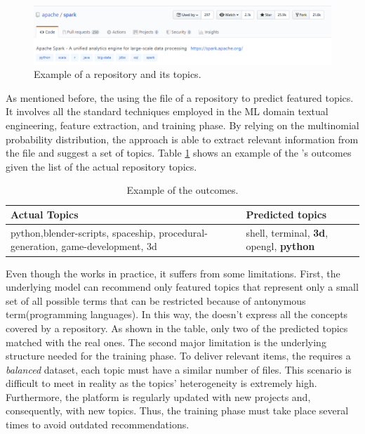 \begin{figure}[h!]
	\centering
	\includegraphics[width=0.8\linewidth]{figs/spark_topics.png}
	\caption{Example of a \GH repository and its topics.}
	\label{fig:spark}
\end{figure}

As mentioned before, the \MNB using the \RM file of a repository to predict featured topics. It involves all the standard techniques employed in the ML domain \ie textual engineering, feature extraction, and training phase. By relying on the multinomial probability distribution, the approach is able to extract relevant information from the \RM file and suggest a set of topics. Table \ref{tab:example} shows an example of the \MNB's outcomes given the list of the actual repository topics. 

\begin{table}[h]
\centering

\resizebox{8.5cm}{!} {

\begin{tabular}{| p{3.2cm} | p{3.2cm} | }
\hline
 \textbf{Actual Topics} &\textbf{ Predicted topics} \\ \hline
     python,blender-scripts, spaceship, procedural-generation, game-development, 3d        &  
  shell, terminal, \textbf{3d},	opengl,	\textbf{python}        \\ \hline

\end{tabular}
}
\caption{Example of the \MNB outcomes.}
\label{tab:example}
\end{table} 


Even though the \MNB works in practice, it suffers from some limitations. First, the underlying model can recommend only featured topics that represent only a small set of all possible terms that can be restricted because of antonymous term(\eg programming languages).
In this way, the \MNB doesn't express all the concepts covered by a \GH repository. As shown in the table, only two of the predicted topics matched with the real ones. The second major limitation is the underlying structure needed for the training phase. To deliver relevant items, the \MNB requires a \emph{balanced} dataset, \ie each topic must have a similar number of  \RM files. This scenario is difficult to meet in reality as the topics' heterogeneity is extremely high. Furthermore, the \GH platform is regularly updated with new projects and, consequently, with new topics. Thus, the training phase must take place several times to avoid outdated recommendations. 